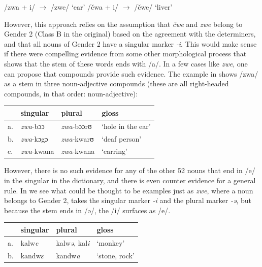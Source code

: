 \begin{exe}
    \ex \label{kasem-wrong-1}
    \begin{xlist}
        \ex /zwa + i/ $\rightarrow$ /zwe/ `ear'
        \ex /čwa + i/ $\rightarrow$ /čwe/ `liver'
    \end{xlist}
\end{exe}

However, this approach relies on the assumption that \textit{čwe} and \textit{zwe} belong to Gender 2 (Class B in the original) based on the agreement with the determiners, and that all nouns of Gender 2 have a singular marker \textit{-i}. This would make sense if there were compelling evidence from some other morphological process that shows that the stem of these words ends with /a/. In a few cases like \textit{zwe}, one can propose that compounds provide such evidence. The example in  shows /zwa/ as a stem in three noun-adjective compounds (these are all right-headed compounds, in that order: noun-adjective):

\begin{exe}
    \ex \label{stem-zwe}
    \begin{tabular}[t]{llll}
      & singular  & plural    & gloss             \\
      \midrule
      a. & \textit{zwa}-bɔɔ   & \textit{zwa}-bɔɔrʊ & `hole in the ear' \\
      b. & \textit{zwa}-kɔgɔ  & \textit{zwa}-kwarʊ & `deaf person'     \\
      c. & \textit{zwa}-kwana & \textit{zwa}-kwana & `earring'         \\
    \end{tabular}
\end{exe}

However, there is no such evidence for any of the other 52 nouns that end in /e/ in the singular in the dictionary, and there is even counter evidence for a general rule. In  we see what could be thought to be examples just as \textit{zwe}, where a noun belongs to Gender 2, takes the singular marker \textit{-i} and the plural marker \textit{-ə}, but because the stem ends in /ə/, the /i/ surfaces as /e/.

\begin{exe}
    \ex \label{stem-E-base}
    \begin{tabular}[t]{llll}
      & singular        & plural                        & gloss         \\
      \midrule
      a. & kalw\textit{e}  & kalw\textit{ə}, kal\textit{i} & `monkey'      \\
      b. & kandw\textit{ɛ} & kandw\textit{a}               & `stone, rock' \\
    \end{tabular}
\end{exe}

